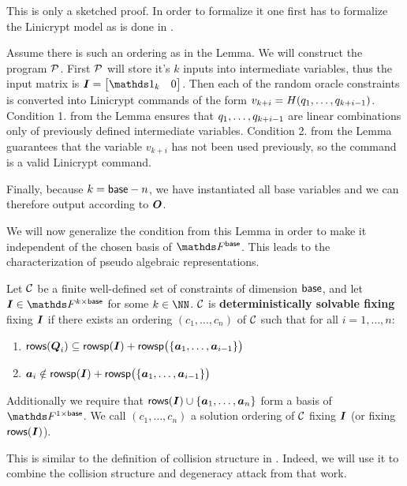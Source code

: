 \begin{sketch}
    This is only a sketched proof.
    In order to formalize it one first has to formalize the Linicrypt model as is done in \cite{C:CarRos16}.

    Assume there is such an ordering as in the Lemma.
    We will construct the program $\P$.
    First $\P$ will store it's $k$ inputs into intermediate variables,
    thus the input matrix is $\I = \m{\Id_k & 0}$.
    Then each of the random oracle constraints is converted into Linicrypt commands of the form
    $v_{k+i} = H(\dts q {k+i-1})$.
    Condition 1. from the Lemma ensures that $\dts q {k+i-1}$ are linear combinations only of previously defined intermediate variables.  
    Condition 2. from the Lemma guarantees that the variable $v_{k+i}$ has not been used previously,
    so the command is a valid Linicrypt command.
    
    Finally, because $k=\base - n$, we have instantiated all base variables and we can therefore output according to $\O$.
\end{sketch}

We will now generalize the condition from this Lemma in order to make it independent of the chosen basis of $\Fsp$.
This leads to the characterization of pseudo algebraic representations.

\begin{defn}
\label{def_det_solvable}
    Let $\C$ be a finite well-defined set of constraints of dimension $\base$,
    and let $\I \in \F^{k \times \base}$ for some $k \in \NN$.
    $\C$ is \textbf{deterministically solvable fixing} fixing $\I$
    if there exists an ordering $(c_1, \dots, c_n)$ of $\C$
    such that for all $i=1, \dots, n$:
    \begin{enumerate}
    \item
        \label{solvable1}
        $\rows(\Q_i) \subseteq \rowsp(\I) + \rowsp\big(\{\va_1, \dots, \va_{i-1}\}\big)$
    \item
        \label{solvable2}
        $\va_i \notin \rowsp(\I) + \rowsp\big(\{\va_1, \dots, \va_{i-1}\}\big)$
    \end{enumerate}
    Additionally we require that $\rows(\I) \cup \{\va_1, \dots, \va_n\}$ form a basis of $\F^{1\times\base}$.
    We call $(c_1, \dots, c_n)$ a solution ordering of $\C$ fixing $\I$ (or fixing $\rows(\I)$).
\end{defn}

This is similar to the definition of collision structure in \cite{TCC:McQSwoRos19}.
Indeed, we will use it to combine the collision structure and degeneracy attack from that work.

